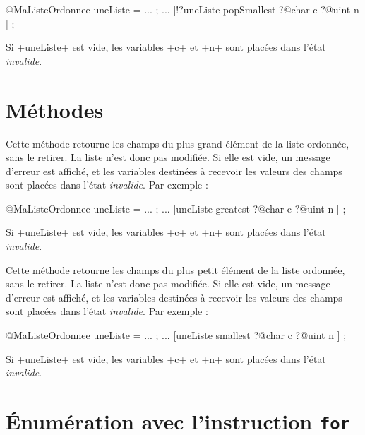 \begin{galgascode}
@MaListeOrdonnee uneListe = ... ;
...
[!?uneListe popSmallest
  ?@char c
  ?@uint n
] ;
\end{galgascode}

Si \ggs+uneListe+ est vide, les variables \ggs+c+ et \ggs+n+ sont placées dans l'état \emph{invalide}.










\section{Méthodes}


Cette méthode retourne les champs du plus grand élément de la liste ordonnée, sans le retirer. La liste n'est donc pas modifiée. Si elle est vide, un message d'erreur est affiché, et les variables destinées à recevoir les valeurs des champs sont placées dans l'état \emph{invalide}. Par exemple :

\begin{galgascode}
@MaListeOrdonnee uneListe = ... ;
...
[uneListe greatest
  ?@char c
  ?@uint n
] ;
\end{galgascode}

Si \ggs+uneListe+ est vide, les variables \ggs+c+ et \ggs+n+ sont placées dans l'état \emph{invalide}.



Cette méthode retourne les champs du plus petit élément de la liste ordonnée, sans le retirer. La liste n'est donc pas modifiée. Si elle est vide, un message d'erreur est affiché, et les variables destinées à recevoir les valeurs des champs sont placées dans l'état \emph{invalide}. Par exemple :

\begin{galgascode}
@MaListeOrdonnee uneListe = ... ;
...
[uneListe smallest
  ?@char c
  ?@uint n
] ;
\end{galgascode}

Si \ggs+uneListe+ est vide, les variables \ggs+c+ et \ggs+n+ sont placées dans l'état \emph{invalide}.




\section{Énumération avec l'instruction \texttt{for}}

